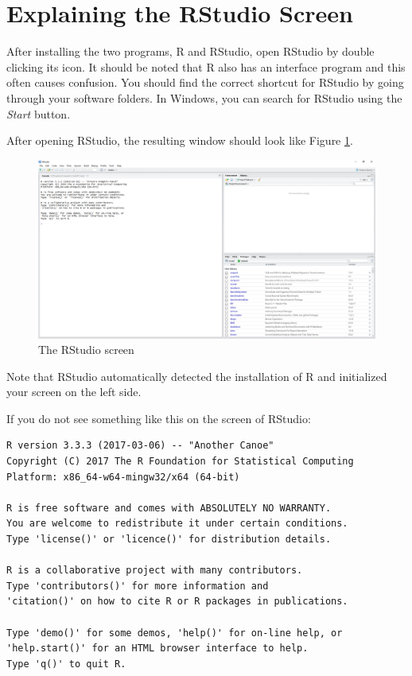 \documentclass[11pt,]{book}
\begin{document}
\section{Explaining the RStudio
Screen}\label{explaining-the-rstudio-screen}

After installing the two programs, R and RStudio, open RStudio by double
clicking its icon. It should be noted that R also has an interface
program and this often causes confusion. You should find the correct
shortcut for RStudio by going through your software folders. In Windows,
you can search for RStudio using the \emph{Start} button.

After opening RStudio, the resulting window should look like Figure
\ref{fig:RStudio1}.

\begin{figure}[!htbp]

{\centering \includegraphics[width=1\linewidth]{figs/RStudio1} 

}

\caption{The RStudio screen}\label{fig:RStudio1}
\end{figure}

Note that RStudio automatically detected the installation of R and
initialized your screen on the left side.

If you do not see something like this on the screen of RStudio:

\begin{verbatim}
R version 3.3.3 (2017-03-06) -- "Another Canoe"
Copyright (C) 2017 The R Foundation for Statistical Computing
Platform: x86_64-w64-mingw32/x64 (64-bit)

R is free software and comes with ABSOLUTELY NO WARRANTY.
You are welcome to redistribute it under certain conditions.
Type 'license()' or 'licence()' for distribution details.

R is a collaborative project with many contributors.
Type 'contributors()' for more information and
'citation()' on how to cite R or R packages in publications.

Type 'demo()' for some demos, 'help()' for on-line help, or
'help.start()' for an HTML browser interface to help.
Type 'q()' to quit R.
\end{verbatim}
\end{document}
